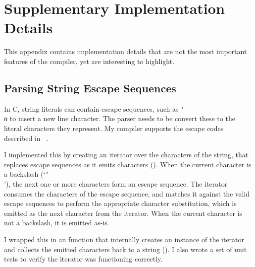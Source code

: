 \documentclass[../00-main.tex]{subfiles}
\begin{document}
\chapter{Supplementary Implementation Details}

This appendix contains implementation details that are not the most important features of the compiler, yet are interesting to highlight.

\section{Parsing String Escape Sequences}\label{app:sec:parsing string escape sequences}

In C, string literals can contain escape sequences, such as \texttt{\char`\\n} to insert a new line character.
The parser needs to be convert these to the literal characters they represent.
My compiler supports the escape codes described in ~.

I implemented this by creating an iterator over the characters of the string, that replaces escape sequences as it emits characters ().
When the current character is a backslash (`\texttt{\char`\\}'), the next one or more characters form an escape sequence.
The iterator consumes the characters of the escape sequence, and matches it against the valid escape sequences to perform the appropriate character substitution, which is emitted as the next character from the iterator.
When the current character is not a backslash, it is emitted as-is.

I wrapped this in an  function that internally creates an instance of the iterator and collects the emitted characters back to a string ().
I also wrote a set of unit tests to verify the iterator was functioning correctly.
\end{document}
